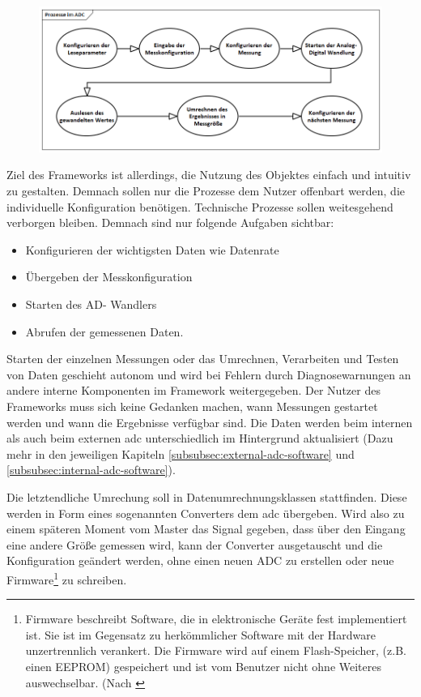 \begin{figure}[!htb]
    \includegraphics[width=1\textwidth]{Figures/Chapter_3/Prozesse im ADC.png}
    
    \label{fig:adc-processes}
\end{figure}

Ziel des Frameworks ist allerdings, die Nutzung des Objektes einfach und intuitiv zu gestalten.
Demnach sollen nur die Prozesse dem Nutzer offenbart werden, die individuelle Konfiguration benötigen.
Technische Prozesse sollen weitesgehend verborgen bleiben.
Demnach sind nur folgende Aufgaben sichtbar:
\begin{itemize}
    \item Konfigurieren der wichtigsten Daten wie Datenrate
    \item Übergeben der Messkonfiguration
    \item Starten des AD- Wandlers
    \item Abrufen der gemessenen Daten.
\end{itemize}
Starten der einzelnen Messungen oder das Umrechnen, Verarbeiten und Testen von Daten geschieht autonom und wird bei Fehlern durch Diagnosewarnungen an andere interne Komponenten im Framework weitergegeben.
Der Nutzer des Frameworks muss sich keine Gedanken machen, wann Messungen gestartet werden und wann die Ergebnisse verfügbar sind.
Die Daten werden beim internen als auch beim externen \ac{adc} unterschiedlich im Hintergrund aktualisiert (Dazu mehr in den jeweiligen Kapiteln \autoref{subsubsec:external-adc-software} und \autoref{subsubsec:internal-adc-software}).

Die letztendliche Umrechung soll in Datenumrechnungsklassen stattfinden.
Diese werden in Form eines sogenannten Converters dem \ac{adc} übergeben.
Wird also zu einem späteren Moment vom Master das Signal gegeben, dass über den Eingang eine andere Größe gemessen wird, kann der Converter ausgetauscht und die Konfiguration geändert werden, ohne einen neuen ADC zu erstellen oder neue Firmware\footnote{Firmware beschreibt Software, die in elektronische Geräte fest implementiert ist. Sie ist im Gegensatz zu herkömmlicher Software mit der Hardware unzertrennlich verankert. Die Firmware wird auf einem Flash-Speicher, (z.B. einen EEPROM) gespeichert und ist vom Benutzer nicht ohne Weiteres auswechselbar. (Nach \textcite[][]{itservice.firmware}} zu schreiben.

